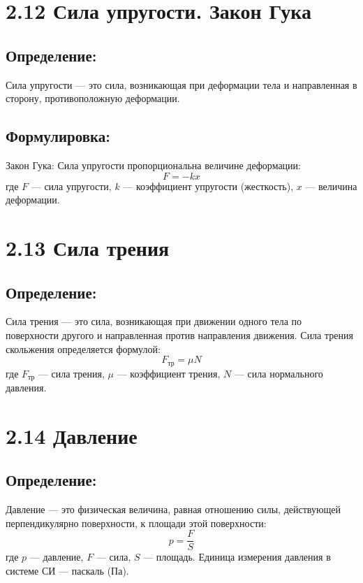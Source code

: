 \documentclass[a4paper, 12pt]{article}
\begin{document}
\newpage


\section*{2.12 Сила упругости. Закон Гука}

\vspace{-9pt}
\subsection*{Определение:}
\vspace{-3pt}
Сила упругости --- это сила, возникающая при деформации тела и направленная в сторону, противоположную деформации.

\vspace{-9pt}
\subsection*{Формулировка:}
\vspace{-3pt}
Закон Гука: Сила упругости пропорциональна величине деформации:
$$ F = -kx $$
где $F $ --- сила упругости, $k $ --- коэффициент упругости (жесткость), $x $ --- величина деформации.


\section*{2.13 Сила трения}

\vspace{-9pt}
\subsection*{Определение:}
\vspace{-3pt}
Сила трения --- это сила, возникающая при движении одного тела по поверхности другого и направленная против направления движения. Сила трения скольжения определяется формулой:
$$ F_{\text{тр}} = \mu N $$
где $F_{\text{тр}} $ --- сила трения, $\mu $ --- коэффициент трения, $N $ --- сила нормального давления.


\section*{2.14 Давление}

\vspace{-9pt}
\subsection*{Определение:}
\vspace{-3pt}
Давление --- это физическая величина, равная отношению силы, действующей перпендикулярно поверхности, к площади этой поверхности:
$$ p = \frac{F}{S} $$
где $p $ --- давление, $F $ --- сила, $S $ --- площадь. Единица измерения давления в системе СИ --- паскаль (Па).
\end{document}
